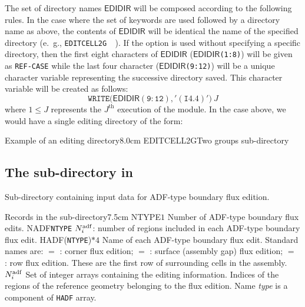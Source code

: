 The set of directory  names $\mathsf{EDIDIR}$ will be composed according to the
following rules. In the case where the set of keywords 
 are used followed by a directory name as above, the contents of
$\mathsf{EDIDIR}$ will be identical the name of the specified directory
(e.~g., \verb*|EDITCELL2G  |). If the  option is used without specifying a specific
directory, then the first eight characters of $\mathsf{EDIDIR}$ ($\mathsf{EDIDIR}$\verb*|(1:8)|)
will be given as
\verb*|REF-CASE| while the last four character ($\mathsf{EDIDIR}$\verb*|(9:12)|) will be a
unique character variable representing the successive directory saved. This character variable will
be created as follows:
\vskip -0.1cm
$$
\mathtt{WRITE(}\mathsf{EDIDIR}\mathtt{(9:12),'(I4.4)')}\: J
$$
\vskip -0.1cm
where $1\leq J $ represents the $J^{\textrm{th}}$ execution of the  module. In the case
above, we would have a single editing directory of the form: 

\begin{DescriptionEnregistrement}{Example of an editing directory}{8.0cm}
\DirEnr
  {EDITCELL2G}{Two groups  sub-directory}
\end{DescriptionEnregistrement}

\goodbreak

\subsection{The  sub-directory in }\label{sect:editionADF}

Sub-directory containing input data for ADF-type boundary flux edition.

\begin{DescriptionEnregistrement}{Records in the  sub-directory}{7.5cm}
\IntEnr
  {NTYPE}{$1$}
  {Number of ADF-type boundary flux edits.}
\IntEnr
  {NADF}{\tt NTYPE}
  {$N^{\rm adf}_i$: number of regions included in each ADF-type boundary flux edit.}
\CharEnr
  {HADF}{({\tt NTYPE})$*4$}
  {Name of each ADF-type boundary flux edit. Standard names are: $=$ :
corner flux edition; $=$ : surface (assembly gap) flux edition; $=$ :
row flux edition. These are the first row of surrounding cells in the assembly.}
\IntVar
  {}{$N^{\rm adf}_i$}
  {Set of integer arrays containing the editing information. Indices of the regions of the reference geometry belonging to the
  flux edition. Name {\sl type} is a component of {\tt HADF} array.}
\end{DescriptionEnregistrement}

\clearpage
